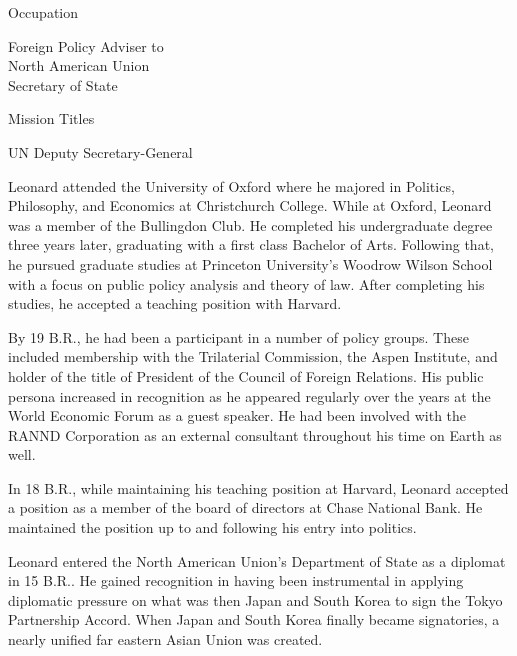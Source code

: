 {        \bTR
            \bTC Occupation \eTC
            \bTC 
                \startitemize[4]
                \startpacked
                \item Foreign Policy Adviser to\\North American Union\\Secretary of State
                \stoppacked
                \stopitemize
            \eTC
        \eTR
        
        \bTR
            \bTC Mission Titles \eTC
            \bTC 
                \startitemize[4]
                \startpacked
                \item UN Deputy Secretary-General
                \stoppacked
                \stopitemize
            \eTC            
        \eTR
    \eTABLEbody

\eTABLE
}

Leonard attended the University of Oxford where he majored in Politics, Philosophy, and Economics at Christchurch College. While at Oxford, Leonard was a member of the Bullingdon Club. He completed his undergraduate degree three years later, graduating with a first class Bachelor of Arts. Following that, he pursued graduate studies at Princeton University's Woodrow Wilson School with a focus on public policy analysis and theory of law. After completing his studies, he accepted a teaching position with Harvard.

By 19 B.R., he had been a participant in a number of policy groups. These included membership with the Trilaterial Commission, the Aspen Institute, and holder of the title of President of the Council of Foreign Relations. His public persona increased in recognition as he appeared regularly over the years at the World Economic Forum as a guest speaker. He had been involved with the RANND Corporation as an external consultant throughout his time on Earth as well.

In 18 B.R., while maintaining his teaching position at Harvard, Leonard accepted a position as a member of the board of directors at Chase National Bank. He maintained the position up to and following his entry into politics.

Leonard entered the North American Union's Department of State as a diplomat in 15 B.R.. He gained recognition in having been instrumental in applying diplomatic pressure on what was then Japan and South Korea to sign the Tokyo Partnership Accord. When Japan and South Korea finally became signatories, a nearly unified far eastern Asian Union was created.

